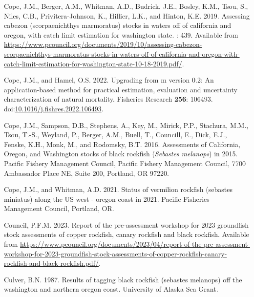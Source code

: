 \documentclass[11pt,
  english,
  letterpaper,
]{article}
\newlength{\cslhangindent}
\newenvironment{CSLReferences}[2] %
 {%
  \setlength{\parindent}{0pt}
  \ifodd #1 \everypar{\setlength{\hangindent}{\cslhangindent}}\ignorespaces\fi
  \ifnum #2 > 0
  \setlength{\parskip}{#2\baselineskip}
  \fi
 }%
 {}
\begin{document}
\begin{CSLReferences}{1}{0}
\leavevmode{}%
Cope, J.M., Berger, A.M., Whitman, A.D., Budrick, J.E., Bosley, K.M., Tsou, S., Niles, C.B., Privitera-Johnson, K., Hillier, L.K., and Hinton, K.E. 2019. Assessing cabezon (scorpaenichthys marmoratus) stocks in waters off of california and oregon, with catch limit estimation for washington state. : 439. Available from \url{https://www.pcouncil.org/documents/2019/10/assessing-cabezon-scorpaenichthys-marmoratus-stocks-in-waters-off-of-california-and-oregon-with-catch-limit-estimation-for-washington-state-10-18-2019.pdf/}.

\leavevmode{}%
Cope, J.M., and Hamel, O.S. 2022. Upgrading from m version 0.2: An application-based method for practical estimation, evaluation and uncertainty characterization of natural mortality. Fisheries Research \textbf{256}: 106493. doi:\href{https://doi.org/10.1016/j.fishres.2022.106493}{10.1016/j.fishres.2022.106493}.

\leavevmode{}%
Cope, J.M., Sampson, D.B., Stephens, A., Key, M., Mirick, P.P., Stachura, M.M., Tsou, T.-S., Weyland, P., Berger, A.M., Buell, T., Councill, E., Dick, E.J., Fenske, K.H., Monk, M., and Rodomsky, B.T. 2016. Assessments of {California}, {Oregon}, and {Washington} stocks of black rockfish (\emph{{Sebastes} melanops}) in 2015. Pacific Fishery Management Council, Pacific Fishery Management Council, 7700 Ambassador Place NE, Suite 200, Portland, OR 97220.

\leavevmode{}%
Cope, J.M., and Whitman, A.D. 2021. Status of vermilion rockfish (sebastes miniatus) along the {US} west - oregon coast in 2021. Pacific Fisheries Management Council, Portland, {OR}.

\leavevmode{}%
Council, P.F.M. 2023. Report of the pre-assessment workshop for 2023 groundfish stock assessments of copper rockfish, canary rockfish and black rockfish. Available from \url{https://www.pcouncil.org/documents/2023/04/report-of-the-pre-assessment-workshop-for-2023-groundfish-stock-assessments-of-copper-rockfish-canary-rockfish-and-black-rockfish.pdf/}.

\leavevmode{}%
Culver, B.N. 1987. Results of tagging black rockfish (sebastes melanops) off the washington and northern oregon coast. University of Alaska Sea Grant.


\end{CSLReferences}
\end{document}
